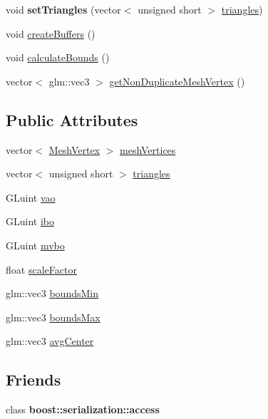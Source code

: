 \begin{DoxyCompactItemize}
\item 
\hypertarget{class_mesh_a30ac5bc862b6c2f6c681c586a9d5ff34}{}void {\bfseries set\+Triangles} (vector$<$ unsigned short $>$ \hyperlink{class_mesh_ad41061e78a04735d509e548141d43a49}{triangles})\label{class_mesh_a30ac5bc862b6c2f6c681c586a9d5ff34}

\item 
void \hyperlink{class_mesh_a508c26a83f4a575f3cdbba07a2118809}{create\+Buffers} ()
\item 
void \hyperlink{class_mesh_a2337847905aa738a21c7b2c459b30bbc}{calculate\+Bounds} ()
\item 
vector$<$ glm\+::vec3 $>$ \hyperlink{class_mesh_abac6433b4de282c3477631e1f00552ee}{get\+Non\+Duplicate\+Mesh\+Vertex} ()
\end{DoxyCompactItemize}
\subsection*{Public Attributes}
\begin{DoxyCompactItemize}
\item 
vector$<$ \hyperlink{struct_mesh_vertex}{Mesh\+Vertex} $>$ \hyperlink{class_mesh_a91899b71cdc960ef485b07ffcd0c0cd6}{mesh\+Vertices}
\item 
vector$<$ unsigned short $>$ \hyperlink{class_mesh_ad41061e78a04735d509e548141d43a49}{triangles}
\item 
G\+Luint \hyperlink{class_mesh_a101a39d88bc5c8d33f0ebd6e77a60129}{vao}
\item 
G\+Luint \hyperlink{class_mesh_a8fb0190a2e74648537e452031c00fb8d}{ibo}
\item 
G\+Luint \hyperlink{class_mesh_ab24bc96d6c0f11d570a193fc133884a7}{mvbo}
\item 
float \hyperlink{class_mesh_a1fc2f16522570f5e3bbed514ac322d9a}{scale\+Factor}
\item 
glm\+::vec3 \hyperlink{class_mesh_a0cb39dfb46a4eb89e748b7966f20e08b}{bounds\+Min}
\item 
glm\+::vec3 \hyperlink{class_mesh_a430e466fef8de4297fb25aa8727b52e3}{bounds\+Max}
\item 
glm\+::vec3 \hyperlink{class_mesh_a666f0d7350993308b29826cf94a86978}{avg\+Center}
\end{DoxyCompactItemize}
\subsection*{Friends}
\begin{DoxyCompactItemize}
\item 
\hypertarget{class_mesh_ac98d07dd8f7b70e16ccb9a01abf56b9c}{}class {\bfseries boost\+::serialization\+::access}\label{class_mesh_ac98d07dd8f7b70e16ccb9a01abf56b9c}

\end{DoxyCompactItemize}


